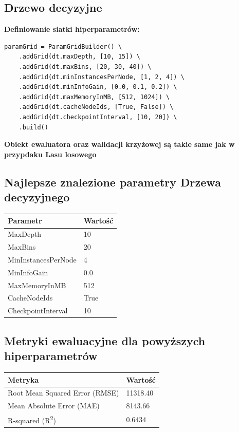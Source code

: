 \documentclass[12pt, a4paper]{report}
\begin{document}
\subsection{Drzewo decyzyjne}
\textbf{Definiowanie siatki hiperparametrów:}
\begin{lstlisting}[caption={Siatka hiperparametrów dla modelu drzewa decyzujnego}]
paramGrid = ParamGridBuilder() \
    .addGrid(dt.maxDepth, [10, 15]) \
    .addGrid(dt.maxBins, [20, 30, 40]) \
    .addGrid(dt.minInstancesPerNode, [1, 2, 4]) \
    .addGrid(dt.minInfoGain, [0.0, 0.1, 0.2]) \
    .addGrid(dt.maxMemoryInMB, [512, 1024]) \
    .addGrid(dt.cacheNodeIds, [True, False]) \
    .addGrid(dt.checkpointInterval, [10, 20]) \
    .build()
\end{lstlisting}
\noindent \textbf{Obiekt ewaluatora oraz walidacji krzyżowej są takie same jak w przypdaku Lasu losowego}

\subsection*{Najlepsze znalezione parametry Drzewa decyzyjnego}
\noindent
\begin{center}
\begin{tabular}{l l}
\toprule
\textbf{Parametr}             & \textbf{Wartość} \\ 
\midrule
MaxDepth                      & 10               \\
MaxBins                       & 20               \\
MinInstancesPerNode           & 4                \\
MinInfoGain                   & 0.0              \\
MaxMemoryInMB                 & 512              \\
CacheNodeIds                  & True             \\
CheckpointInterval            & 10               \\
\bottomrule
\end{tabular}
\end{center}

\vspace{1em}

\subsection*{Metryki ewaluacyjne dla powyższych hiperparametrów}

\noindent
\begin{center}
\begin{tabular}{l l}
\toprule
\textbf{Metryka}              & \textbf{Wartość} \\ 
\midrule
Root Mean Squared Error (RMSE) & 11318.40         \\
Mean Absolute Error (MAE)     & 8143.66          \\
R-squared (R\textsuperscript{2}) & 0.6434          \\
\bottomrule
\end{tabular}
\end{center}
\end{document}
